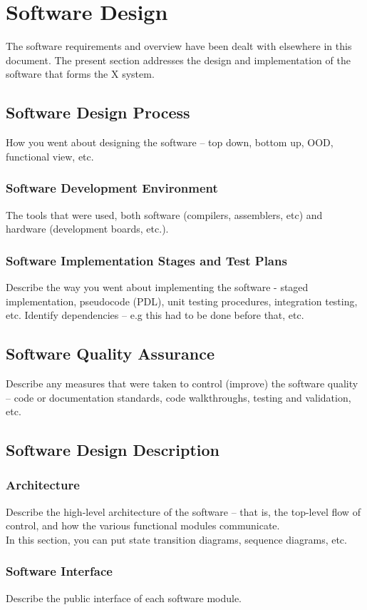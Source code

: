 \documentclass[11pt,a4paper]{article}
\begin{document}
\section{Software Design}
The software requirements and overview have been dealt with elsewhere in this document. The present section addresses the design and implementation of the software that forms the X system.
\subsection{Software Design Process}
How you went about designing the software – top down, bottom up, OOD, functional view, etc.
\subsubsection{Software Development Environment}
The tools that were used, both software (compilers, assemblers, etc) and hardware (development boards, etc.).
\subsubsection{Software Implementation Stages and Test Plans}
Describe the way you went about implementing the software - staged implementation, pseudocode (PDL), unit testing procedures, integration testing, etc. Identify dependencies – e.g this had to be done before that, etc.
\subsection{Software Quality Assurance}
Describe any measures that were taken to control (improve) the software quality – code or documentation standards, code walkthroughs, testing and validation, etc.

\subsection{Software Design Description}
\subsubsection{Architecture}
Describe the high-level architecture of the software – that is, the top-level flow of control, and how the various functional modules communicate.\\
In this section, you can put state transition diagrams, sequence diagrams, etc.
\subsubsection{Software Interface}
Describe the public interface of each software module.
\end{document}
